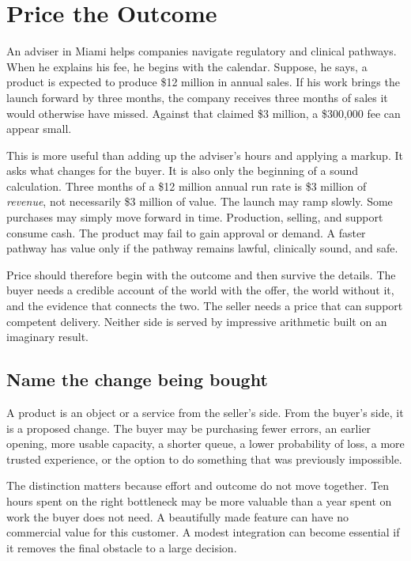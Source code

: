 \chapter{Price the Outcome}

An adviser in Miami helps companies navigate regulatory and clinical pathways.
When he explains his fee, he begins with the calendar. Suppose, he says, a
product is expected to produce \$12 million in annual sales. If his work brings
the launch forward by three months, the company receives three months of sales
it would otherwise have missed. Against that claimed \$3 million, a \$300,000
fee can appear small.

This is more useful than adding up the adviser's hours and applying a markup.
It asks what changes for the buyer. It is also only the beginning of a sound
calculation. Three months of a \$12 million annual run rate is \$3 million of
\emph{revenue}, not necessarily \$3 million of value. The launch may ramp
slowly. Some purchases may simply move forward in time. Production, selling,
and support consume cash. The product may fail to gain approval or demand. A
faster pathway has value only if the pathway remains lawful, clinically sound,
and safe.

Price should therefore begin with the outcome and then survive the details.
The buyer needs a credible account of the world with the offer, the world
without it, and the evidence that connects the two. The seller needs a price
that can support competent delivery. Neither side is served by impressive
arithmetic built on an imaginary result.

\section{Name the change being bought}

A product is an object or a service from the seller's side. From the buyer's
side, it is a proposed change. The buyer may be purchasing fewer errors, an
earlier opening, more usable capacity, a shorter queue, a lower probability of
loss, a more trusted experience, or the option to do something that was
previously impossible.

The distinction matters because effort and outcome do not move together. Ten
hours spent on the right bottleneck may be more valuable than a year spent on
work the buyer does not need. A beautifully made feature can have no commercial
value for this customer. A modest integration can become essential if it
removes the final obstacle to a large decision.

